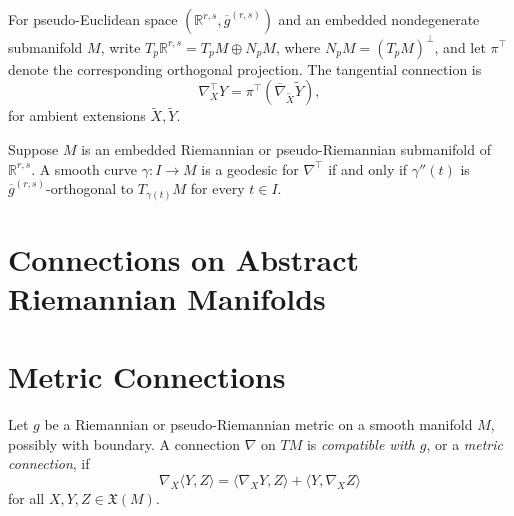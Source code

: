 For pseudo-Euclidean space $(\mathbb R^{r,s},\overline g^{(r,s)})$ and an
embedded nondegenerate submanifold $M$, write
$T_p\mathbb R^{r,s}=T_pM\oplus N_pM$, where
$N_pM=(T_pM)^\perp$, and let $\pi^\top$ denote the corresponding orthogonal
projection. The tangential connection is
\[
\nabla_X^\top Y=\pi^\top(\overline\nabla_{\widetilde X}\widetilde Y),
\]
for ambient extensions $\widetilde X,\widetilde Y$.

\begin{proposition}
\label{prop:geodesic-pseudo-euclidean-submanifold}

Suppose $M$ is an embedded Riemannian or pseudo-Riemannian submanifold of
$\mathbb R^{r,s}$. A smooth curve $\gamma:I\to M$ is a geodesic for
$\nabla^\top$ if and only if $\gamma''(t)$ is
$\overline g^{(r,s)}$-orthogonal to $T_{\gamma(t)}M$ for every $t\in I$.
\end{proposition}

\section{Connections on Abstract Riemannian Manifolds}

\section{Metric Connections}

Let $g$ be a Riemannian or pseudo-Riemannian metric on a smooth manifold $M$,
possibly with boundary. A connection $\nabla$ on $TM$ is \emph{compatible
with $g$}, or a \emph{metric connection}, if
\begin{equation}
\nabla_X\langle Y,Z\rangle
=\langle\nabla_XY,Z\rangle+\langle Y,\nabla_XZ\rangle
\tag{5.1}
\end{equation}
for all $X,Y,Z\in\mathfrak X(M)$.

